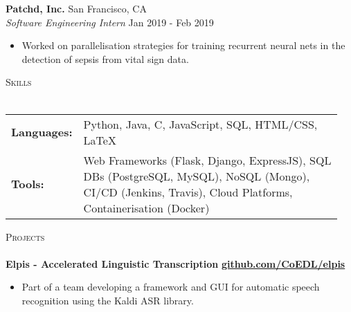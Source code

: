 \documentclass[a4paper]{article}
\newcommand{\lineunder} {
    \vspace*{-8pt} \\
    \hspace*{-10pt} \hrulefill \\
}
\newcommand{\header} [1] {
    {\hspace*{-10pt}\vspace*{6pt} \textsc{#1}}
    \vspace*{-6pt} \lineunder
}
\newenvironment{myitemize}
{   \small
    \vspace{-2pt}
    \begin{itemize}
    \setlength{\itemsep}{0pt}
    \setlength{\parskip}{0pt}
    \setlength{\parsep}{0pt}     }
{ \end{itemize}                  }
\newenvironment{singleitem}
{   \small
    \vspace{0pt}
    \begin{itemize}
    \setlength{\itemsep}{0pt}
    \setlength{\parskip}{0pt}
    \setlength{\parsep}{0pt}   }
{\end{itemize} \vspace{1pt}	}
\begin{document}
\textbf{Patchd, Inc.} \hfill San Francisco, CA\\
\textit{Software Engineering Intern} \hfill  Jan 2019 - Feb 2019\\
\begin{myitemize} \itemsep 0.5mm
	\item Worked on parallelisation strategies for training recurrent neural nets in the detection of sepsis from vital sign data.
\end{myitemize}

\vspace{0.5mm}
\header{Skills}
\vspace{1.5mm}
\begin{tabular}{p{0.12\linewidth}p{0.83\linewidth}}
	\textbf{Languages:} & Python, Java, C, JavaScript, SQL, HTML/CSS, \LaTeX \\
	\textbf{Tools:} & Web Frameworks (Flask, Django, ExpressJS), SQL DBs (PostgreSQL, MySQL), NoSQL (Mongo), CI/CD (Jenkins, Travis), Cloud Platforms, Containerisation (Docker)
\end{tabular}

\vspace{1.5mm}

\header{Projects}

\textbf{{Elpis - Accelerated Linguistic Transcription}} \hfill \textbf{\href{https://github.com/CoEDL/elpis}{github.com/CoEDL/elpis}}
\begin{singleitem}
	\item Part of a team developing a framework and GUI for automatic speech recognition using the Kaldi ASR library.
\end{singleitem}
\end{document}
